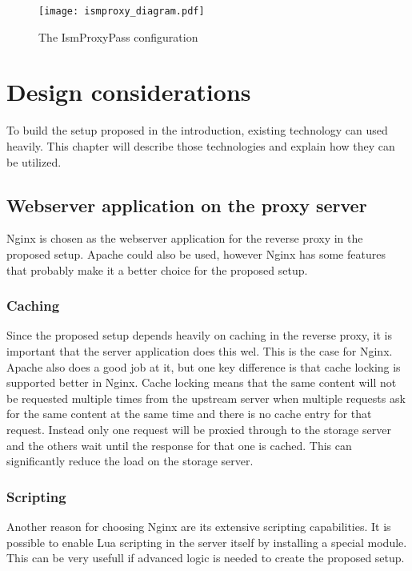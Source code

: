 \documentclass[twoside,openright]{uva-bachelor-thesis}
\begin{document}
\begin{figure}

    \texttt{[image: ismproxy\_diagram.pdf]}
    \caption{The IsmProxyPass configuration}
    \label{fig:ismproxy}

\end{figure}







\chapter{Design considerations}
To build the setup proposed in the introduction, existing technology can used
heavily. This chapter will describe those technologies and explain how they can
be utilized.


\section{Webserver application on the proxy server}
Nginx is chosen as the webserver application for the reverse proxy in the
proposed setup. Apache could also be used, however Nginx has some features that
probably make it a better choice for the proposed setup.

\subsection{Caching} \label{sec:caching}
Since the proposed setup depends heavily on caching in the reverse proxy, it is
important that the server application does this wel. This is the case for Nginx.
Apache also does a good job at it, but one key difference is that cache locking is
supported better in Nginx. Cache locking means that the same content will not be
requested multiple times from the upstream server when multiple requests ask for
the same content at the same time and there is no cache entry for that
request. Instead only one request will be proxied through to the storage server
and the others wait until the response for that one is cached. This can
significantly reduce the load on the storage server.

\subsection{Scripting}
Another reason for choosing Nginx are its extensive scripting capabilities. It
is possible to enable Lua scripting in the server itself by installing a special
module\autocite{nginxlua}. This can be very usefull if advanced logic is needed
to create the proposed setup.
\end{document}
